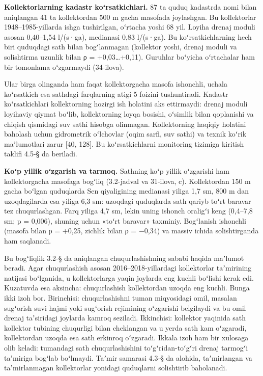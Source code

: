 \documentclass[14pt,a4paper,oneside]{extreport}
\begin{document}
\textbf{Kollektorlarning kadastr koʻrsatkichlari.} 87 ta quduq kadastrda
nomi bilan aniqlangan 41 ta kollektordan 500 m gacha masofada
joylashgan. Bu kollektorlar 1948--1985-yillarda ishga tushirilgan,
oʻrtacha yoshi 68 yil. Loyiha drenaj moduli asosan 0,40--1,54 l/(s·ga),
medianasi 0,83 l/(s·ga). Bu koʻrsatkichlarning hech biri quduqdagi sath
bilan bogʻlanmagan (kollektor yoshi, drenaj moduli va solishtirma
uzunlik bilan ρ = +0,03\ldots+0,11). Guruhlar boʻyicha oʻrtachalar ham
bir tomonlama oʻzgarmaydi (34-ilova).

Ular birga olinganda ham faqat kollektorgacha masofa ishonchli, uchala
koʻrsatkich esa sathdagi farqlarning atigi 5 foizini tushuntiradi.
Kadastr koʻrsatkichlari kollektorning hozirgi ish holatini aks
ettirmaydi: drenaj moduli loyihaviy qiymat boʻlib, kollektorning loyqa
bosishi, oʻsimlik bilan qoplanishi va chiqish qismidagi suv sathi
hisobga olinmagan. Kollektorning haqiqiy holatini baholash uchun
gidrometrik oʻlchovlar (oqim sarfi, suv sathi) va texnik koʻrik
maʼlumotlari zarur {[}40, 128{]}. Bu koʻrsatkichlarni monitoring
tizimiga kiritish taklifi 4.5-§ da beriladi.

\textbf{Koʻp yillik oʻzgarish va tarmoq.} Sathning koʻp yillik
oʻzgarishi ham kollektorgacha masofaga bogʻliq (3.2-jadval va 31-ilova,
c). Kollektordan 150 m gacha boʻlgan quduqlarda Sen qiyaligining
medianasi yiliga 1,7 sm, 800 m dan uzoqdagilarda esa yiliga 6,3 sm:
uzoqdagi quduqlarda sath qariyb toʻrt baravar tez chuqurlashgan. Farq
yiliga 4,7 sm, lekin uning ishonch oraligʻi keng (0,4--7,8 sm; p =
0,006), shuning uchun «toʻrt baravar» taxminiy. Bogʻlanish ishonchli
(masofa bilan ρ = +0,25, zichlik bilan ρ = −0,34) va massiv ichida
solishtirganda ham saqlanadi.

Bu bogʻliqlik 3.2-§ da aniqlangan chuqurlashishning sababi haqida
maʼlumot beradi. Agar chuqurlashish asosan 2016--2018-yillardagi
kollektorlar taʼmirining natijasi boʻlganida, u kollektorlarga yaqin
joylarda eng kuchli boʻlishi kerak edi. Kuzatuvda esa aksincha:
chuqurlashish kollektordan uzoqda eng kuchli. Bunga ikki izoh bor.
Birinchisi: chuqurlashishni tuman miqyosidagi omil, masalan sugʻorish
suvi hajmi yoki sugʻorish rejimining oʻzgarishi belgilaydi va bu omil
drenaj taʼsiridagi joylarda kamroq seziladi. Ikkinchisi: kollektor
yaqinida sath kollektor tubining chuqurligi bilan cheklangan va u yerda
sath kam oʻzgaradi, kollektordan uzoqda esa sath erkinroq oʻzgaradi.
Ikkala izoh ham bir xulosaga olib keladi: tumandagi sath
chuqurlashishini toʻgʻridan-toʻgʻri drenaj tarmogʻi taʼmiriga bogʻlab
boʻlmaydi. Taʼmir samarasi 4.3-§ da alohida, taʼmirlangan va
taʼmirlanmagan kollektorlar yonidagi quduqlarni solishtirib baholanadi.
\end{document}

